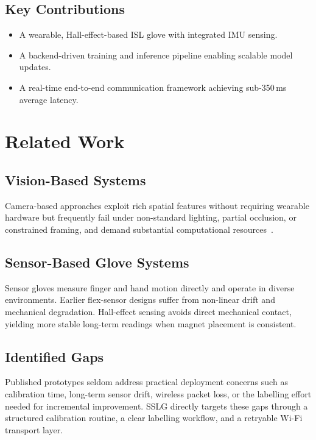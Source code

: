 \documentclass[conference]{IEEEtran}
\newcommand{\SystemAcronym}{SSLG }
\begin{document}
\subsection{Key Contributions}
\begin{itemize}[noitemsep, topsep=2pt]
  \item A wearable, Hall-effect-based ISL glove with integrated IMU sensing.
  \item A backend-driven training and inference pipeline enabling scalable model updates.
  \item A real-time end-to-end communication framework achieving sub-350\,ms average latency.
\end{itemize}

\section{Related Work}

\subsection{Vision-Based Systems}

Camera-based approaches exploit rich spatial features without requiring wearable
hardware but frequently fail under non-standard lighting, partial occlusion, or
constrained framing, and demand substantial computational resources~\cite{mitra}.

\subsection{Sensor-Based Glove Systems}

Sensor gloves measure finger and hand motion directly and operate in diverse
environments. Earlier flex-sensor designs suffer from non-linear drift and
mechanical degradation. Hall-effect sensing avoids direct mechanical contact,
yielding more stable long-term readings when magnet placement is consistent.

\subsection{Identified Gaps}

Published prototypes seldom address practical deployment concerns such as
calibration time, long-term sensor drift, wireless packet loss, or the labelling
effort needed for incremental improvement. \SystemAcronym directly targets these
gaps through a structured calibration routine, a clear labelling workflow, and
a retryable Wi-Fi transport layer.
\end{document}
